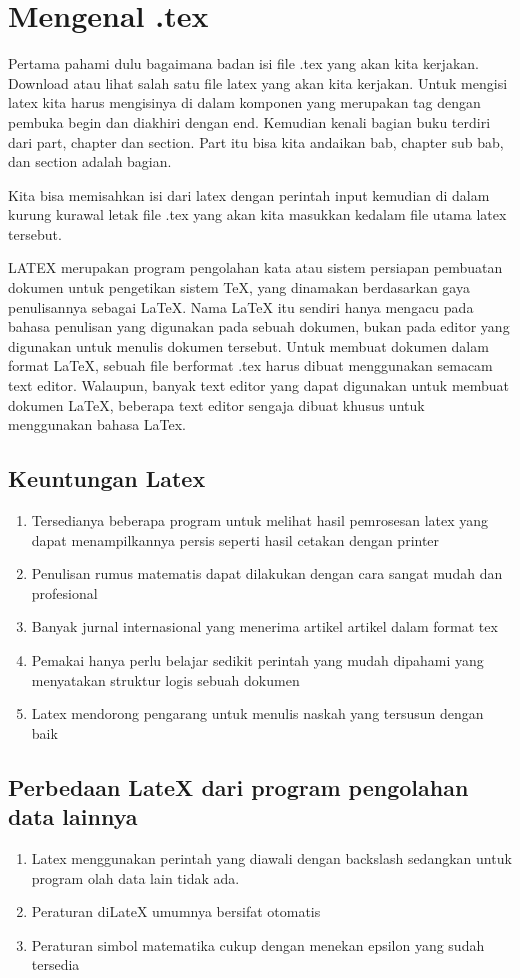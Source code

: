 \section{Mengenal .tex}
Pertama pahami dulu bagaimana badan isi file .tex yang akan kita kerjakan. Download atau lihat salah satu file latex yang akan kita kerjakan. Untuk mengisi latex kita harus mengisinya di dalam komponen  yang merupakan tag dengan pembuka begin dan diakhiri dengan end.
Kemudian kenali bagian buku terdiri dari part, chapter dan section. Part itu bisa kita andaikan bab, chapter sub bab, dan section adalah bagian.

Kita bisa memisahkan isi dari latex dengan perintah input kemudian di dalam kurung kurawal letak file .tex yang akan kita masukkan kedalam file utama latex tersebut.

LATEX merupakan program pengolahan kata atau sistem persiapan pembuatan dokumen untuk pengetikan sistem TeX, yang dinamakan berdasarkan gaya penulisannya sebagai LaTeX. Nama LaTeX itu sendiri hanya mengacu pada bahasa penulisan yang digunakan pada sebuah dokumen, bukan pada editor yang digunakan untuk menulis dokumen tersebut. Untuk membuat dokumen dalam format LaTeX, sebuah file berformat .tex harus dibuat menggunakan semacam text editor. Walaupun, banyak text editor yang dapat digunakan untuk membuat dokumen LaTeX, beberapa text editor sengaja dibuat khusus untuk menggunakan bahasa LaTex.
\subsection{Keuntungan Latex}
\begin{enumerate}
  \item Tersedianya beberapa program untuk melihat hasil pemrosesan latex yang dapat menampilkannya persis seperti hasil cetakan dengan printer
  \item Penulisan rumus matematis dapat dilakukan dengan cara sangat mudah dan profesional
  \item Banyak jurnal internasional yang menerima artikel artikel dalam format tex
  \item Pemakai hanya perlu belajar sedikit perintah yang mudah dipahami yang menyatakan struktur logis sebuah dokumen
  \item Latex mendorong pengarang untuk menulis naskah yang tersusun dengan baik
\end{enumerate}

\subsection{Perbedaan LateX dari program pengolahan data lainnya}
\begin{enumerate}
\item Latex menggunakan perintah yang diawali dengan backslash sedangkan untuk program olah data lain tidak ada.
\item Peraturan diLateX umumnya bersifat otomatis
\item Peraturan simbol matematika cukup dengan menekan epsilon yang sudah tersedia
\end{enumerate}

